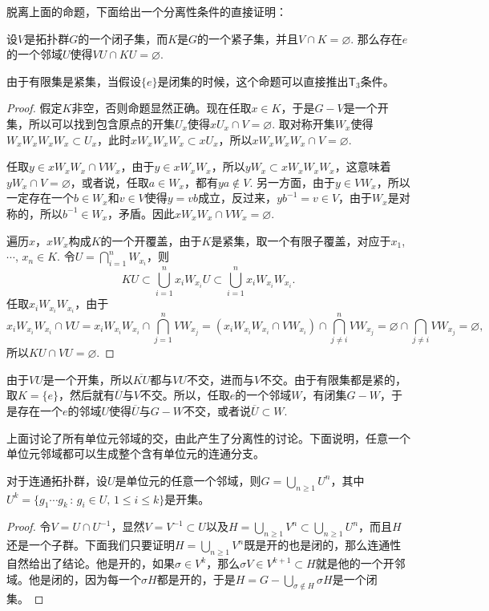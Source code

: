 脱离上面的命题，下面给出一个分离性条件的直接证明：

\begin{pro}\label{1.16}
设$V$是拓扑群$G$的一个闭子集，而$K$是$G$的一个紧子集，并且$V\cap K=\varnothing$. 那么存在$e$的一个邻域$U$使得$VU\cap KU=\varnothing$.
\end{pro}

由于有限集是紧集，当假设$\{e\}$是闭集的时候，这个命题可以直接推出$\mathsf{T}_3$条件。

\begin{proof}
	假定$K$非空，否则命题显然正确。现在任取$x\in K$，于是$G-V$是一个开集，所以可以找到包含原点的开集$U_x$使得$xU_x\cap V=\varnothing$. 取对称开集$W_x$使得$W_xW_xW_xW_x\subset U_x$，此时$xW_xW_xW_x\subset xU_x$，所以$xW_xW_xW_x\cap V=\varnothing$. 

	任取$y\in xW_xW_x\cap VW_x$，由于$y\in xW_xW_x$，所以$yW_x\subset xW_xW_xW_x$，这意味着$yW_x\cap V=\varnothing$，或者说，任取$a\in W_x$，都有$ya\not\in V$. 另一方面，由于$y\in VW_x$，所以一定存在一个$b\in W_x$和$v\in V$使得$y=vb$成立，反过来，$yb^{-1}=v\in V$，由于$W_x$是对称的，所以$b^{-1}\in W_x$，矛盾。因此$xW_xW_x\cap VW_x=\varnothing$.

	遍历$x$，$xW_x$构成$K$的一个开覆盖，由于$K$是紧集，取一个有限子覆盖，对应于$x_1$, $\cdots$, $x_n\in K$. 令$U=\bigcap_{i=1}^n W_{x_i}$，则
	\[
	KU\subset \bigcup_{i=1}^n {x_i}W_{x_i}U\subset \bigcup_{i=1}^n x_iW_{x_i}W_{x_i}.
	\]
	任取$x_iW_{x_i}W_{x_i}$，由于
	\[
		x_iW_{x_i}W_{x_i}\cap VU=x_iW_{x_i}W_{x_i}\cap \bigcap_{j=1}^n VW_{x_j}=(x_iW_{x_i}W_{x_i}\cap VW_{x_i})\cap \bigcap_{j\neq i}^n VW_{x_j}=\varnothing \cap \bigcap_{j\neq i} VW_{x_j}=\varnothing,
	\]
	所以$KU\cap VU=\varnothing$.
\end{proof}

由于$VU$是一个开集，所以$\overline{KU}$都与$VU$不交，进而与$V$不交。由于有限集都是紧的，取$K=\{e\}$，然后就有$\overline{U}$与$V$不交。所以，任取$e$的一个邻域$W$，有闭集$G-W$，于是存在一个$e$的邻域$U$使得$\overline{U}$与$G-W$不交，或者说$\overline{U}\subset W$.

上面讨论了所有单位元邻域的交，由此产生了分离性的讨论。下面说明，任意一个单位元邻域都可以生成整个含有单位元的连通分支。

\begin{lem}\label{lem:116}
对于连通拓扑群，设$U$是单位元的任意一个邻域，则$G=\bigcup_{n\geq 1}U^n$，其中$U^k=\{g_1\cdots g_k\,:\,g_i\in U,\, 1\leq i \leq k\}$是开集。
\end{lem}

\begin{proof}
令$V=U\cap U^{-1}$，显然$V=V^{-1}\subset U$以及$H=\bigcup_{n\geq 1}V^n\subset \bigcup_{n\geq 1}U^n$，而且$H$还是一个子群。下面我们只要证明$H=\bigcup_{n\geq 1}V^n$既是开的也是闭的，那么连通性自然给出了结论。他是开的，如果$\sigma\in V^k$，那么$\sigma V\in V^{k+1}\subset H$就是他的一个开邻域。他是闭的，因为每一个$\sigma H$都是开的，于是$H=G-\bigcup_{\sigma\notin H}\sigma H$是一个闭集。
\end{proof}

